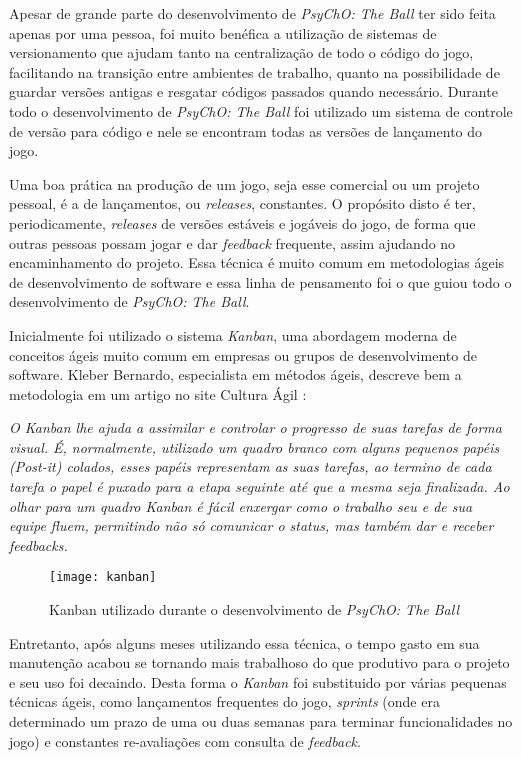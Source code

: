 Apesar de grande parte do desenvolvimento de \textit{PsyChO: The Ball} ter sido feita apenas por uma pessoa, foi muito benéfica a utilização de sistemas de versionamento que ajudam tanto na centralização de todo o código do jogo, facilitando na transição entre ambientes de trabalho, quanto na possibilidade de guardar versões antigas e resgatar códigos passados quando necessário. Durante todo o desenvolvimento de \textit{PsyChO: The Ball} foi utilizado um sistema de controle de versão para código e nele se encontram todas as versões de lançamento do jogo.

Uma boa prática na produção de um jogo, seja esse comercial ou um projeto pessoal, é a de lançamentos, ou \textit{releases}, constantes. O propósito disto é ter, periodicamente, \textit{releases} de versões estáveis e jogáveis do jogo, de forma que outras pessoas possam jogar e dar \textit{feedback} frequente, assim ajudando no encaminhamento do projeto. Essa técnica é muito comum em metodologias ágeis de desenvolvimento de software e essa linha de pensamento foi o que guiou todo o desenvolvimento de \textit{PsyChO: The Ball}.

Inicialmente foi utilizado o sistema \textit{Kanban}, uma abordagem moderna de conceitos ágeis muito comum em empresas ou grupos de desenvolvimento de software. Kleber Bernardo, especialista em métodos ágeis, descreve bem a metodologia em um artigo no site Cultura Ágil \cite{kleberkanban}:

\begin{displayquote}
  \textit{O Kanban lhe ajuda a assimilar e controlar o progresso de suas tarefas de forma visual. É, normalmente, utilizado um quadro branco com alguns pequenos papéis (Post-it) colados, esses papéis representam as suas tarefas, ao termino de cada tarefa o papel é puxado para a etapa seguinte até que a mesma seja finalizada. Ao olhar para um quadro Kanban é fácil enxergar como o trabalho seu e de sua equipe fluem, permitindo não só comunicar o status, mas também dar e receber feedbacks.}
\end{displayquote}

\begin{figure}[h!]
\texttt{[image: kanban]}
\centering
\caption{Kanban utilizado durante o desenvolvimento de \textit{PsyChO: The Ball}}
\end{figure}

Entretanto, após alguns meses utilizando essa técnica, o tempo gasto em sua manutenção acabou se tornando mais trabalhoso do que produtivo para o projeto e seu uso foi decaindo. Desta forma o \textit{Kanban} foi substituido por várias pequenas técnicas ágeis, como lançamentos frequentes do jogo, \textit{sprints} (onde era determinado um prazo de uma ou duas semanas para terminar funcionalidades no jogo) e constantes re-avaliações com consulta de \textit{feedback}.

